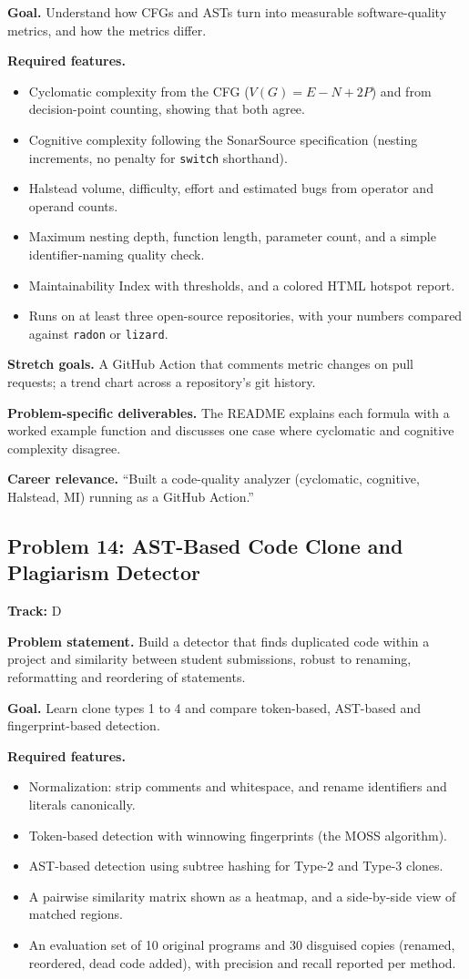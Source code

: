 \documentclass[11pt,a4paper]{article}
\newcommand{\fld}[1]{\par\smallskip\textbf{\color{accent}#1}\quad}
\newcommand{\meta}[1]{%
  \begin{tcolorbox}[colback=softbg,colframe=softbg,boxsep=2pt,left=4pt,right=4pt,top=2pt,bottom=2pt,arc=2pt]
  \small\textbf{Track:} #1
  \end{tcolorbox}}
\begin{document}
\fld{Goal.} Understand how CFGs and ASTs turn into measurable software-quality metrics, and how the metrics differ.

\fld{Required features.}
\begin{itemize}
  \item Cyclomatic complexity from the CFG ($V(G) = E - N + 2P$) and from decision-point counting, showing that both agree.
  \item Cognitive complexity following the SonarSource specification (nesting increments, no penalty for \texttt{switch} shorthand).
  \item Halstead volume, difficulty, effort and estimated bugs from operator and operand counts.
  \item Maximum nesting depth, function length, parameter count, and a simple identifier-naming quality check.
  \item Maintainability Index with thresholds, and a colored HTML hotspot report.
  \item Runs on at least three open-source repositories, with your numbers compared against \texttt{radon} or \texttt{lizard}.
\end{itemize}

\fld{Stretch goals.} A GitHub Action that comments metric changes on pull requests; a trend chart across a repository's git history.

\fld{Problem-specific deliverables.} The README explains each formula with a worked example function
and discusses one case where cyclomatic and cognitive complexity disagree.

\fld{Career relevance.} ``Built a code-quality analyzer (cyclomatic, cognitive, Halstead, MI) running as a GitHub Action.''

\subsection{Problem 14: AST-Based Code Clone and Plagiarism Detector}
\meta{D}

\fld{Problem statement.} Build a detector that finds duplicated code within a project and similarity
between student submissions, robust to renaming, reformatting and reordering of statements.

\fld{Goal.} Learn clone types 1 to 4 and compare token-based, AST-based and fingerprint-based detection.

\fld{Required features.}
\begin{itemize}
  \item Normalization: strip comments and whitespace, and rename identifiers and literals canonically.
  \item Token-based detection with winnowing fingerprints (the MOSS algorithm).
  \item AST-based detection using subtree hashing for Type-2 and Type-3 clones.
  \item A pairwise similarity matrix shown as a heatmap, and a side-by-side view of matched regions.
  \item An evaluation set of 10 original programs and 30 disguised copies (renamed, reordered, dead code added), with precision and recall reported per method.
\end{itemize}
\end{document}
